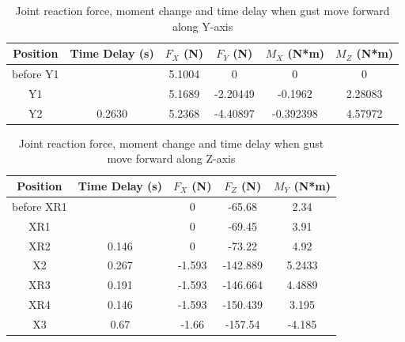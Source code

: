 \begin{table}
    \centering
    \begin{tabular}{cccccc}
    \hline
        Position & Time Delay (s) & $F_{X}$ (N) & $F_{Y}$ (N)& $M_{X}$ (N*m) & $M_{Z}$ (N*m) \\
    \hline
        before Y1   &           & 5.1004 & 0        & 0         & 0 \\
        Y1          &           & 5.1689 & -2.20449 & -0.1962   & 2.28083 \\
        Y2          & 0.2630    & 5.2368 & -4.40897 & -0.392398 & 4.57972 \\
    \hline
    \end{tabular}
    \caption{Joint reaction force, moment change and time delay when gust move forward along Y-axis}
    \label{tab:verify y}
\end{table}
\begin{table}
    \centering
    \begin{tabular}{ccccc}
    \hline
        Position & Time Delay (s) & $F_{X}$ (N) & $F_{Z}$ (N) & $M_{Y}$ (N*m)\\
    \hline
        before XR1  &       &  0        & -65.68    & 2.34        \\       
        XR1         &       &  0        & -69.45    & 3.91         \\   
        XR2         & 0.146 &  0        & -73.22   & 4.92        \\       
        X2          & 0.267 &  -1.593   & -142.889  & 5.2433     \\       
        XR3         & 0.191 &  -1.593   & -146.664   & 4.4889      \\       
        XR4         & 0.146 &  -1.593   & -150.439  &  3.195    \\           
        X3          & 0.67  &  -1.66    & -157.54   &  -4.185    \\           
    \hline
    \end{tabular}
    \caption{Joint reaction force, moment change and time delay when gust move forward along Z-axis}
    \label{tab:verify z}
\end{table}

